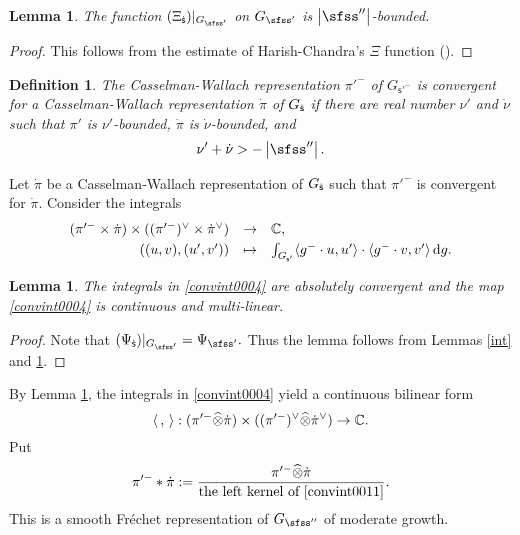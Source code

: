 \documentclass[12pt,a4paper]{amsart}
\def\abs#1{\left|{#1}\right|}
\newcommand{\od}{\operatorname{d}}
\newcommand{\la}{\langle}
\newcommand{\ra}{\rangle}
\newcommand{\be}{\begin {equation}}
\newcommand{\ee}{\end {equation}}
\numberwithin{equation}{section}
\newtheorem{lem}[thm]{Lemma}
\newtheorem{defn}[thm]{Definition}
\theoremstyle{remark}
\begin{document}
\begin{lem}\label{boundxx}
The function $(\Xi_\dsfss)|_{G_{\sfss'}}$ on $G_{\sfss'}$  is   $\abs{\sfss''}$-bounded.
\end{lem}
\begin{proof}
This follows from the  estimate of Harish-Chandra's $\Xi$ function (\cite[Theorem 4.5.3]{Wa1}).
\end{proof}


 \begin{defn}\label{defn:CR33}
The Casselman-Wallach representation  $\pi'^-$ of $G_{\mathsf s'^-}$ is convergent  for a Casselman-Wallach representation  $\dot \pi$ of $G_{{\dot{\mathsf s}}}$ if there are real number $\nu'$ and $\dot \nu$ such that $\pi'$ is $\nu'$-bounded, $\dot \pi$ is $\dot \nu$-bounded, and
\[
  \nu'+\dot \nu>-\abs{\sfss''}.
\]
\end{defn}

Let $\dot \pi$  be a Casselman-Wallach representation of $G_{{\dot{\mathsf s}}}$ such that $\pi'^-$  is convergent  for  $\dot \pi$.
Consider the integrals
\be\label{convint0004}
\begin{array}{rcl}
 (\pi'^- \times \dot \pi)\times ((\pi'^-)^\vee \times \dot \pi^\vee )&\rightarrow &\C, \smallskip \\
   ((u,v),(u',v')) &\mapsto &\int_{G_{\mathsf s'}} \la g^-\cdot u, u'\ra\cdot \la g^-\cdot v, v'\ra \od\! g.
   \end{array}
 \ee

\begin{lem}\label{intpi0004}
The integrals in \eqref{convint0004} are absolutely convergent and the map \eqref{convint0004} is   continuous and multi-linear.
\end{lem}
\begin{proof}
Note that
$
  (\Psi_{\dsfss})|_{G_{\sfss'}}=\Psi_{\sfss'}.
$
Thus the lemma follows from Lemmas \ref{int} and \ref{boundxx}.
\end{proof}



By Lemma \ref{intpi0004}, the integrals in \eqref{convint0004} yield a continuous bilinear form
\be\label{convint0011}
 \la\,,\,\ra: (\pi'^- \widehat \otimes{ \dot \pi})\times ((\pi'^-)^\vee \widehat \otimes {\dot \pi}^\vee )\rightarrow \C.
 \ee
Put
\begin{equation}\label{thetab0}
 \pi'^-*\dot \pi:=\frac{\pi'^-\widehat \otimes \dot \pi}{\textrm{the left kernel of \eqref{convint0011}}}.
\end{equation}
This is a smooth Fr\'echet representation of $G_{\sfss''}$ of moderate growth.
\end{document}
